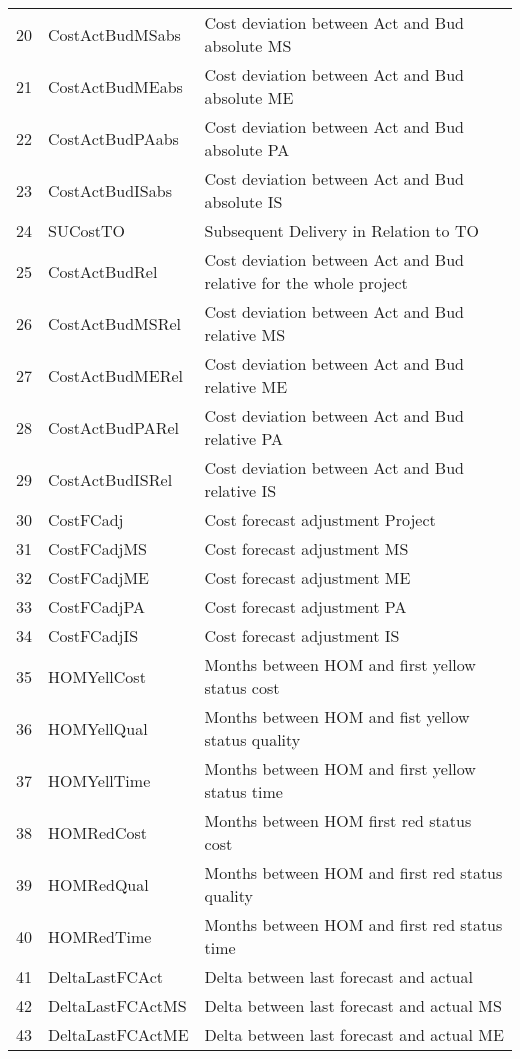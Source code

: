 \begin{longtable}[ht]{p{} p{}p{}}
20    & CostActBudMSabs & Cost deviation between Act and Bud absolute MS \\
21    & CostActBudMEabs & Cost deviation between Act and Bud absolute ME \\
22    & CostActBudPAabs & Cost deviation between Act and Bud absolute PA \\
23    & CostActBudISabs & Cost deviation between Act and Bud absolute IS \\
24    & SUCostTO & Subsequent Delivery in Relation to TO \\
25    & CostActBudRel & Cost deviation between Act and Bud relative for the whole project \\
26    & CostActBudMSRel & Cost deviation between Act and Bud relative MS \\
27    & CostActBudMERel & Cost deviation between Act and Bud relative ME\\
28    & CostActBudPARel & Cost deviation between Act and Bud relative PA \\
29    & CostActBudISRel & Cost deviation between Act and Bud relative IS \\
30    & CostFCadj & Cost forecast adjustment Project \\
31    & CostFCadjMS & Cost forecast adjustment MS \\
32    & CostFCadjME & Cost forecast adjustment ME \\
33    & CostFCadjPA & Cost forecast adjustment PA \\
34    & CostFCadjIS & Cost forecast adjustment IS \\
35    & HOMYellCost & Months between HOM and first yellow status cost \\
36    & HOMYellQual & Months between HOM and fist yellow status quality \\
37    & HOMYellTime & Months between HOM and first yellow status time \\
38    & HOMRedCost & Months between HOM first red status cost \\
39    & HOMRedQual & Months between HOM and first red status quality \\
40    & HOMRedTime & Months between HOM and first red status time \\
41    & DeltaLastFCAct & Delta between last forecast and actual  \\
42    & DeltaLastFCActMS & Delta between last forecast and actual MS \\
43    & DeltaLastFCActME & Delta between last forecast and actual ME \\

\end{longtable}
